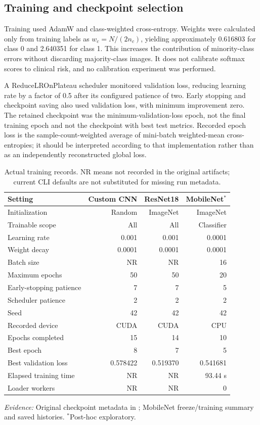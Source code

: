 \documentclass[11pt,a4paper]{article}
\newcommand{\code}[1]{\texttt{\detokenize{#1}}}
\newcommand{\source}[1]{{\footnotesize\textit{Evidence:} #1}}
\begin{document}
\subsection{Training and checkpoint selection}
Training used AdamW \citep{loshchilov2019} and class-weighted cross-entropy. Weights were calculated only from training labels as $w_c=N/(2n_c)$, yielding approximately 0.616803 for class 0 and 2.640351 for class 1. This increases the contribution of minority-class errors without discarding majority-class images. It does not calibrate softmax scores to clinical risk, and no calibration experiment was performed.

A ReduceLROnPlateau scheduler monitored validation loss, reducing learning rate by a factor of 0.5 after its configured patience of two. Early stopping and checkpoint saving also used validation loss, with minimum improvement zero. The retained checkpoint was the minimum-validation-loss epoch, not the final training epoch and not the checkpoint with best test metrics. Recorded epoch loss is the sample-count-weighted average of mini-batch weighted-mean cross-entropies; it should be interpreted according to that implementation rather than as an independently reconstructed global loss.

\begin{table}[htbp]
\centering\small
\caption{Actual training records. NR means not recorded in the original artifacts; current CLI defaults are not substituted for missing run metadata.}
\label{tab:training}
\begin{tabular}{p{48mm}rrr}\toprule
Setting & Custom CNN & ResNet18 & MobileNet$^{*}$ \\\midrule
Initialization & Random & ImageNet & ImageNet \\
Trainable scope & All & All & Classifier \\
Learning rate & 0.001 & 0.001 & 0.0001 \\
Weight decay & 0.0001 & 0.0001 & 0.0001 \\
Batch size & NR & NR & 16 \\
Maximum epochs & 50 & 50 & 20 \\
Early-stopping patience & 7 & 7 & 5 \\
Scheduler patience & 2 & 2 & 2 \\
Seed & 42 & 42 & 42 \\
Recorded device & CUDA & CUDA & CPU \\
Epochs completed & 15 & 14 & 10 \\
Best epoch & 8 & 7 & 5 \\
Best validation loss & 0.578422 & 0.519370 & 0.541681 \\
Elapsed training time & NR & NR & 93.44 s \\
Loader workers & NR & NR & 0 \\\bottomrule
\end{tabular}
\par\source{Original checkpoint metadata in \code{reports/artifact_verification.json}; MobileNet freeze/training summary and saved histories. $^{*}$Post-hoc exploratory.}
\end{table}
\end{document}
